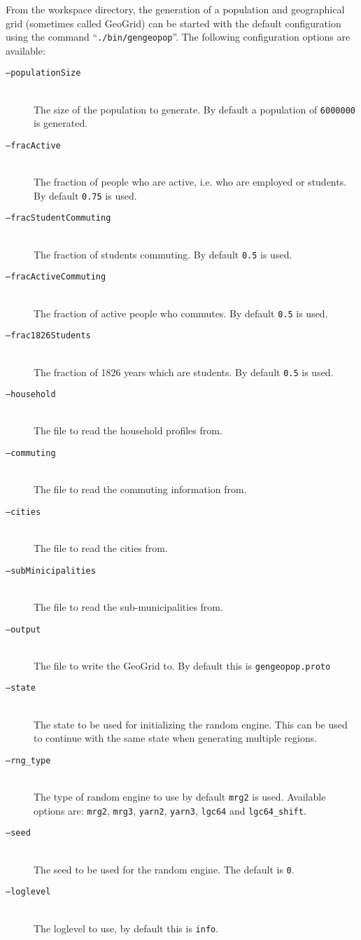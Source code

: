 From the workspace directory, the generation of a population and geographical grid (sometimes called GeoGrid) can be started with the default configuration using the command \mbox{``\texttt{./bin/gengeopop}''}. The following configuration options are available:

\begin{description}
    \item[\texttt{--populationSize}] \ \\ 
        The size of the population to generate. By default a population of \texttt{6000000} is generated.
    \item[\texttt{--fracActive}] \ \\
        The fraction of people who are active, i.e. who are employed or students. By default \texttt{0.75} is used.
    \item[\texttt{--fracStudentCommuting}] \ \\
        The fraction of students commuting. By default \texttt{0.5} is used.
    \item[\texttt{--fracActiveCommuting}] \ \\
        The fraction of active people who commutes. By default \texttt{0.5} is used.
    \item[\texttt{--frac1826Students}] \ \\
        The fraction of 1826 years which are students. By default \texttt{0.5} is used.
    \item[\texttt{--household}] \ \\
        The file to read the household profiles from.
    \item[\texttt{--commuting}] \ \\
        The file to read the commuting information from.
    \item[\texttt{--cities}] \ \\
        The file to read the cities from.
    \item[\texttt{--subMinicipalities}] \ \\
        The file to read the sub-municipalities from.
    \item[\texttt{--output}] \ \\
        The file to write the GeoGrid to. By default this is \texttt{gengeopop.proto}
    \item[\texttt{--state}] \ \\
        The state to be used for initializing the random engine. This can be used to continue with the same state when generating multiple regions.
    \item[\texttt{--rng\_type}] \ \\
        The type of random engine to use by default \texttt{mrg2} is used. Available options are: \texttt{mrg2}, \texttt{mrg3}, \texttt{yarn2}, \texttt{yarn3}, \texttt{lgc64} and \texttt{lgc64\_shift}.
    \item[\texttt{--seed}] \ \\
        The seed to be used for the random engine. The default is \texttt{0}.
    \item[\texttt{--loglevel}] \ \\ 
        The loglevel to use, by default this is \texttt{info}.
\end{description}

